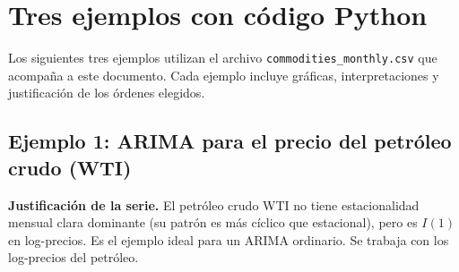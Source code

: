 \documentclass[12pt,a4paper]{article}
\theoremstyle{definition}
\begin{document}
\section{Tres ejemplos con código Python}

Los siguientes tres ejemplos utilizan el archivo \texttt{commodities\_monthly.csv}
que acompaña a este documento. Cada ejemplo incluye gráficas, interpretaciones
y justificación de los órdenes elegidos.

\subsection{Ejemplo 1: ARIMA para el precio del petróleo crudo (WTI)}

\noindent\textbf{Justificación de la serie.} El petróleo crudo WTI no tiene
estacionalidad mensual clara dominante (su patrón es más cíclico que estacional),
pero es $I(1)$ en log-precios. Es el ejemplo ideal para un ARIMA ordinario.
Se trabaja con los log-precios del petróleo.
\end{document}
